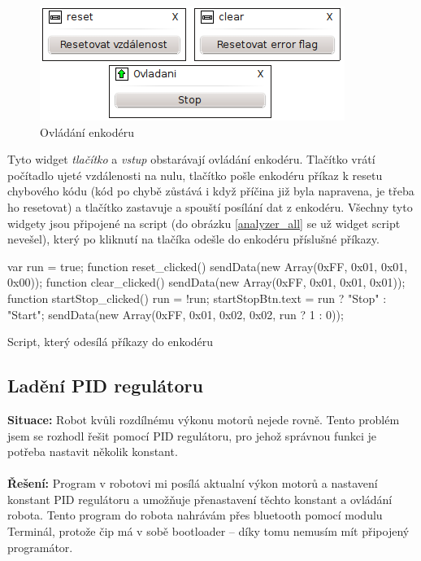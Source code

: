 \documentclass[12pt, a4paper, oneside]{article}
\newcommand{\It}{\textit}  %
\begin{document}
\begin{figure}[H]
\begin{center}
\includegraphics[width=\textwidth-50pt]{img/enc_ctrl.png}
\caption{Ovládání enkodéru}
\end{center}
\end{figure}
Tyto widget \It{tlačítko} a \It{vstup} obstarávají ovládání enkodéru. Tlačítko  vrátí počítadlo ujeté vzdálenosti na nulu, tlačítko  pošle enkodéru příkaz k resetu chybového kódu (kód po chybě zůstává i když příčina již byla napravena, je třeba ho resetovat) a tlačítko  zastavuje a spouští posílání dat z enkodéru. Všechny tyto widgety jsou připojené na script (do obrázku \ref{analyzer_all} se už widget script nevešel), který po kliknutí na tlačíka odešle do enkodéru příslušné příkazy.
\begin{listing}[H]
\begin{jscode}
var run = true;
function reset_clicked() {
    sendData(new Array(0xFF, 0x01, 0x01, 0x00));
}
function clear_clicked() {
    sendData(new Array(0xFF, 0x01, 0x01, 0x01));
}
function startStop_clicked() {
    run = !run;
    startStopBtn.text = run ? "Stop" : "Start";
    sendData(new Array(0xFF, 0x01, 0x02, 0x02, run ? 1 : 0));
}
\end{jscode}
\caption{Script, který odesílá příkazy do enkodéru}
\end{listing}

\newpage
\subsection{Ladění PID regulátoru}
{\bf Situace:} Robot kvůli rozdílnému výkonu motorů nejede rovně. Tento problém jsem se rozhodl řešit pomocí PID regulátoru, pro jehož správnou funkci je potřeba nastavit několik konstant. \\
\\
{\bf Řešení:} Program v robotovi mi posílá aktualní výkon motorů a nastavení konstant PID regulátoru a umožňuje přenastavení těchto konstant a ovládání robota. Tento program do robota nahrávám přes bluetooth pomocí modulu Terminál, protože čip má v sobě bootloader -- díky tomu nemusím mít připojený programátor.  
\end{document}

